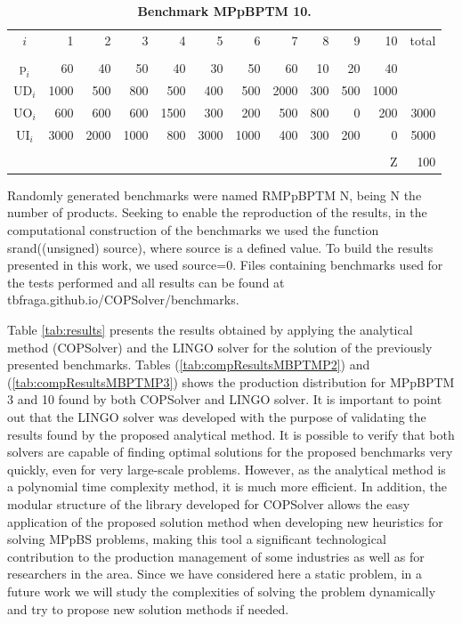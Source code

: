 \documentclass[10pt,fleqn,a4paper,twoside]{article}
\begin{document}
\begin{table}[ht]
\begin{center}
\caption{\textbf{Benchmark MPpBPTM 10.}}
\begin{small}
\begin{tabular}[c]{c r r r r r r r r r r r }
\\
$i$ & 1 & 2 & 3 & 4 & 5 & 6 & 7 & 8 & 9 & 10 & total \\
\cline {1-12} \\
$\textrm{p}_i$ & 60 & 40 & 50 & 40 & 30 & 50 & 60 & 10 & 20 & 40\\
$\textrm{UD}_i$ & 1000 & 500 & 800 & 500 & 400 & 500 & 2000 & 300 & 500 & 1000 \\
$\textrm{UO}_i$ & 600 & 600 & 600 & 1500 & 300 & 200 & 500 & 800 & 0 & 200 & 3000 \\
$\textrm{UI}_i$ & 3000 & 2000 & 1000 & 800 & 3000 & 1000 & 400 & 300 & 200 & 0 & 5000 \\
\cline {1-12} \\
& & & & & & & & & & $\textrm{Z}$ & 100 \\
\end{tabular}
\label{tab:MBPTMP003}
\end{small}
\end{center}
\end{table}

Randomly generated benchmarks were named RMPpBPTM $\textrm{N}$, being $\textrm{N}$ the number of products. Seeking to enable the reproduction of the results, in the computational construction of the benchmarks we used the function srand((unsigned) source), where source is a defined value. To build the results presented in this work, we used source=0. Files containing benchmarks used for the tests performed and all results can be found at tbfraga.github.io/COPSolver/benchmarks.

Table \ref{tab:results} presents the results obtained by applying the analytical method (COPSolver) and the LINGO solver for the solution of the previously presented benchmarks. Tables (\ref{tab:compResultsMBPTMP2}) and (\ref{tab:compResultsMBPTMP3}) shows the production distribution for MPpBPTM 3 and 10 found by both COPSolver and LINGO solver. It is important to point out that the LINGO solver was developed with the purpose of validating the results found by the proposed analytical method. It is possible to verify that both solvers are capable of finding optimal solutions for the proposed benchmarks very quickly, even for very large-scale problems. However, as the analytical method is a polynomial time complexity method, it is much more efficient. In addition, the modular structure of the library developed for COPSolver allows the easy application of the proposed solution method when developing new heuristics for solving MPpBS problems, making this tool a significant technological contribution to the production management of some industries as well as for researchers in the area. Since we have considered here a static problem, in a future work we will study the complexities of solving the problem dynamically and try to propose new solution methods if needed. 
\end{document}
